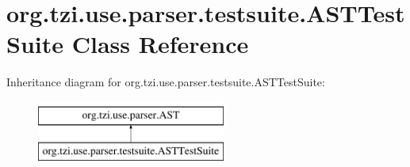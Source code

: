 \hypertarget{classorg_1_1tzi_1_1use_1_1parser_1_1testsuite_1_1_a_s_t_test_suite}{\section{org.\-tzi.\-use.\-parser.\-testsuite.\-A\-S\-T\-Test\-Suite Class Reference}
\label{classorg_1_1tzi_1_1use_1_1parser_1_1testsuite_1_1_a_s_t_test_suite}
}
Inheritance diagram for org.\-tzi.\-use.\-parser.\-testsuite.\-A\-S\-T\-Test\-Suite\-:\begin{figure}[H]
\begin{center}
\leavevmode
\includegraphics[height=2.000000cm]{classorg_1_1tzi_1_1use_1_1parser_1_1testsuite_1_1_a_s_t_test_suite}
\end{center}
\end{figure}
